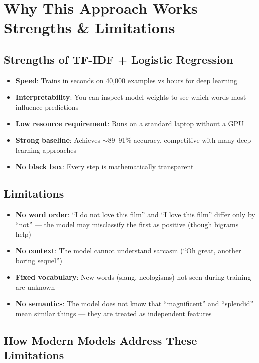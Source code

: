 \documentclass[12pt, a4paper]{article}
\begin{document}
\newpage

\section{Why This Approach Works — Strengths \& Limitations}

\subsection{Strengths of TF-IDF + Logistic Regression}

\begin{itemize}
  \item \textbf{Speed}: Trains in seconds on 40{,}000 examples vs hours for deep learning
  \item \textbf{Interpretability}: You can inspect model weights to see which words most influence predictions
  \item \textbf{Low resource requirement}: Runs on a standard laptop without a GPU
  \item \textbf{Strong baseline}: Achieves $\sim$89--91\% accuracy, competitive with many deep learning approaches
  \item \textbf{No black box}: Every step is mathematically transparent
\end{itemize}

\subsection{Limitations}

\begin{itemize}
  \item \textbf{No word order}: ``I do not love this film'' and ``I love this film'' differ only by ``not'' — the model may misclassify the first as positive (though bigrams help)
  \item \textbf{No context}: The model cannot understand sarcasm (``Oh great, another boring sequel'')
  \item \textbf{Fixed vocabulary}: New words (slang, neologisms) not seen during training are unknown
  \item \textbf{No semantics}: The model does not know that ``magnificent'' and ``splendid'' mean similar things — they are treated as independent features
\end{itemize}

\subsection{How Modern Models Address These Limitations}
\end{document}
